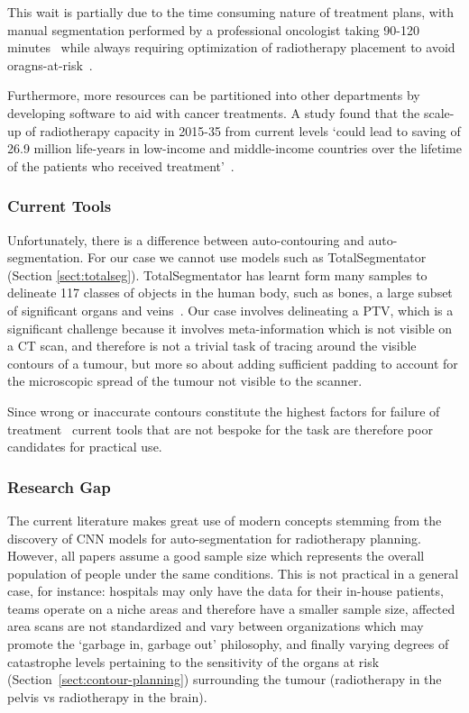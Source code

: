 \documentclass[12pt,twoside]{report}
\begin{document}
This wait is partially due to the time consuming nature of treatment plans, with manual segmentation performed by a professional oncologist taking 90-120 minutes~\cite{LIU2020184,Sartor2020-et} while always requiring optimization of radiotherapy placement to avoid oragns-at-risk~\cite{Samarasinghe2021-ps}.

Furthermore, more resources can be partitioned into other departments by developing software to aid with cancer treatments. A study found that the scale-up of radiotherapy capacity in 2015-35 from current levels `could lead to saving of 26.9 million life-years in low-income and middle-income countries over the lifetime of the patients who received treatment'~\cite{expanding-global-access-to-radiotherapy}.

\subsubsection{Current Tools}

Unfortunately, there is a difference between auto-contouring and auto-segmentation. For our case we cannot use models such as TotalSegmentator (Section \ref{sect:totalseg}). TotalSegmentator has learnt form many samples to delineate 117 classes of objects in the human body, such as bones, a large subset of significant organs and veins~\cite{totalsegmentor-git}. Our case involves delineating a PTV, which is a significant challenge because it involves meta-information which is not visible on a CT scan, and therefore is not a trivial task of tracing around the visible contours of a tumour, but more so about adding sufficient padding to account for the microscopic spread of the tumour not visible to the scanner.

Since wrong or inaccurate contours constitute the highest factors for failure of treatment~\cite{Rhee2020-ms} current tools that are not bespoke for the task are therefore poor candidates for practical use.

\subsubsection{Research Gap}

The current literature makes great use of modern concepts stemming from the discovery of CNN models for auto-segmentation for radiotherapy planning. However, all papers assume a good sample size which represents the overall population of people under the same conditions. This is not practical in a general case, for instance: hospitals may only have the data for their in-house patients, teams operate on a niche areas and therefore have a smaller sample size, affected area scans are not standardized and vary between organizations which may promote the `garbage in, garbage out' philosophy, and finally varying degrees of catastrophe levels pertaining to the sensitivity of the organs at risk (Section~\ref{sect:contour-planning}) surrounding the tumour (radiotherapy in the pelvis vs radiotherapy in the brain).
\end{document}
